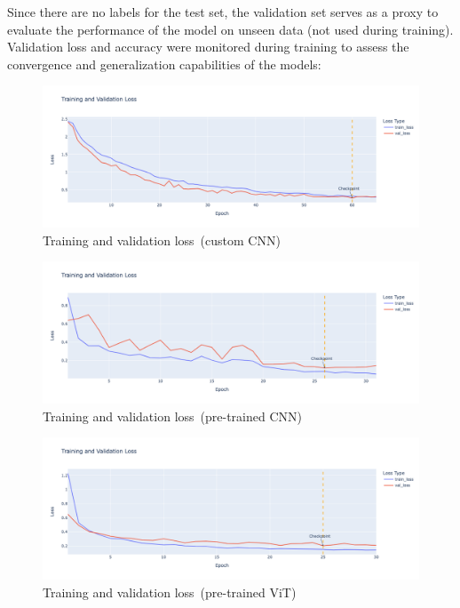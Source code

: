 Since there are no labels for the test set, the validation set serves as a proxy to evaluate the performance of the model on unseen data (not used during training). Validation loss and accuracy were monitored during training to assess the convergence and generalization capabilities of the models:

\begin{figure}[htbp]
    \centerline{\includegraphics[width=0.9\linewidth]{../../resources/custom_cnn/loss.png}}
    \caption{Training and validation loss~(custom CNN)}
    \label{fig:loss-custom-cnn}
\end{figure}

\begin{figure}[htbp]
    \centerline{\includegraphics[width=0.9\linewidth]{../../resources/resnet/loss.png}}
    \caption{Training and validation loss~(pre-trained CNN)}
    \label{fig:loss-pretrained-cnn}
\end{figure}

\begin{figure}[htbp]
    \centerline{\includegraphics[width=0.9\linewidth]{../../resources/vit/loss.png}}
    \caption{Training and validation loss~(pre-trained ViT)}
    \label{fig:loss-pretrained-vit}
\end{figure}

